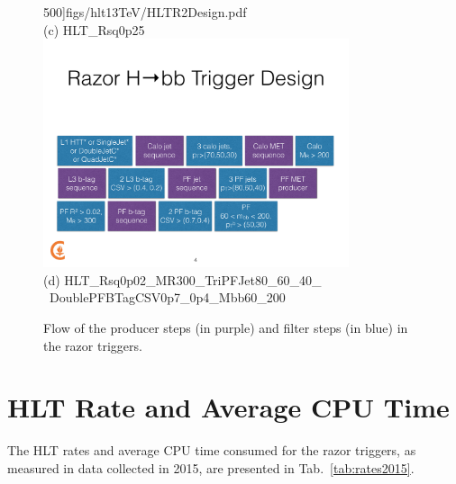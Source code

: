 \begin{figure}[ht!]
500]{figs/hlt13TeV/HLTR2Design.pdf}\\
(c) HLT\_Rsq0p25\\
\includegraphics[width=0.8\textwidth,clip=true,viewport=0 110 1024
500]{figs/hlt13TeV/HLTRazorHbbDesign.pdf}\\
(d) HLT\_Rsq0p02\_MR300\_TriPFJet80\_60\_40\_\\
~DoublePFBTagCSV0p7\_0p4\_Mbb60\_200
\caption{\label{fig:HLTdesign} Flow of the producer steps (in purple)
  and filter steps (in blue) in
  the razor triggers.}
\end{figure}

\section{HLT Rate and Average CPU Time}

The HLT rates and average CPU time consumed for the razor triggers, as measured in data
collected in 2015, are presented in Tab.~\ref{tab:rates2015}.


